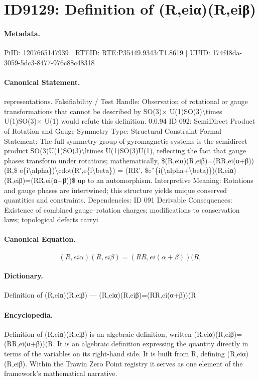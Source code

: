 \section*{ID9129: Definition of (R,eiα)(R,eiβ)}
\paragraph{Metadata.}
PiID: 1207665147939 | RTEID: RTE:P35449.9343:T1.8619 | UUID: 174f48da-3059-5dc3-8477-976c88c48318

\paragraph{Canonical Statement.}
representations. Falsifiability / Test Handle: Observation of rotational or gauge transformations that cannot be described by SO(3)× U(1)SO(3)\textbackslash{}times U(1)SO(3)× U(1) would refute this definition. 0.0.94 ID 092: SemiDirect Product of Rotation and Gauge Symmetry Type: Structural Constraint Formal Statement: The full symmetry group of gyromagnetic systems is the semidirect product SO(3)U(1)SO(3)\textbackslash{}ltimes U(1)SO(3)U(1), reflecting the fact that gauge phases transform under rotations; mathematically, \$(R,eiα)(R,eiβ)=(RR,ei(α+β))(R,\$ e\{i\textbackslash{}alpha\})\textbackslash{}cdot(R’,e\{i\textbackslash{}beta\}) = (RR’, \$eˆ\{i(\textbackslash{}alpha+\textbackslash{}beta)\})(R,eiα)(R,eiβ)=(RR,ei(α+β))\$ up to an automorphism. Interpretive Meaning: Rotations and gauge phases are intertwined; this structure yields unique conserved quantities and constraints. Dependencies: ID 091 Derivable Consequences: Existence of combined gauge–rotation charges; modifications to conservation laws; topological defects carryi

\paragraph{Canonical Equation.}
\[
(R,eiα)(R,eiβ)=(RR,ei(α+β))(R,
\]

\paragraph{Dictionary.}
Definition of (R,eiα)(R,eiβ) — (R,eiα)(R,eiβ)=(RR,ei(α+β))(R

\paragraph{Encyclopedia.}
Definition of (R,eiα)(R,eiβ) is an algebraic definition, written (R,eiα)(R,eiβ)=(RR,ei(α+β))(R. It is an algebraic definition expressing the quantity directly in terms of the variables on its right-hand side. It is built from R, defining (R,eiα)(R,eiβ). Within the Trawin Zero Point registry it serves as one element of the framework's mathematical narrative.
